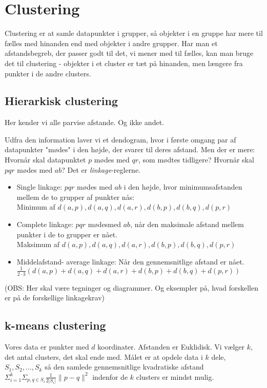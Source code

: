 \documentclass[a4paper, 12pt]{article}
\theoremstyle{remark}
\begin{document}
\section*{Clustering}

Clustering er at samle datapunkter i grupper, så objekter i en gruppe har mere til fælles med hinanden end med objekter i andre grupper. Har man et afstandsbegreb, der passer godt til det, vi mener med til fælles, kan man bruge det til clustering - objekter i et cluster er tæt på hinanden, men længere fra punkter i de andre clusters. 
\subsection*{Hierarkisk clustering}
Her kender vi alle parvise afstande. Og ikke andet. 

Udfra den information laver vi et dendogram, hvor i første omgang par af datapunkter "mødes" i den højde, der svarer til deres afstand. Men der er mere: Hvornår skal datapunktet $p$ mødes med $qr$, som mødtes tidligere? Hvornår skal $pqr$ mødes med $ab$?  Det er \emph{linkage}-reglerne.
\begin{itemize}
\item Single linkage: $pqr$ mødes med $ab$ i den højde, hvor minimumsafstanden mellem de to grupper af punkter nås:\\ Minimum af $d(a,p),d(a,q), d(a,r), d(b,p), d(b,q), d(p,r)$
\item Complete linkage: $pqr$ mødesmed $ab$, når den maksimale afstand mellem punkter i de to grupper er nået. \\Maksimum af $d(a,p),d(a,q), d(a,r), d(b,p), d(b,q), d(p,r)$
\item Middelafstand- average linkage: Når den gennemsnitlige afstand er nået. $\frac{1}{2\cdot 3}(d(a,p)+d(a,q)+ d(a,r)+ d(b,p)+ d(b,q)+ d(p,r))$
\end{itemize}
(OBS: Her skal være tegninger og diagrammer. Og eksempler på, hvad forskellen er på de forskellige linkagekrav)
\subsection*{k-means clustering}
 Vores data er punkter med $d$ koordinater. Afstanden er Euklidisk. Vi vælger $k$, det antal clusters, det skal ende med. Målet er at opdele data i $k$ dele, $S_1, S_2,\ldots , S_k$ så den samlede gennemsnitlige kvadratiske afstand $\Sigma_{i=1}^{k}\Sigma_{p,q\in S_i}\frac{1}{2|S_i|}\|p-q\|^2$ indenfor de $k$ clusters er mindst mulig. 
\end{document}
